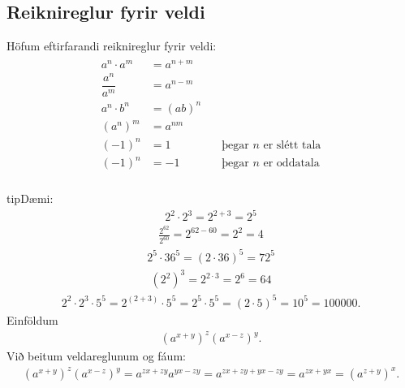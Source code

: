 \documentclass[a4paper,10pt,icelandic]{sphinxmanual}
\begin{document}
\subsection{Reiknireglur fyrir veldi}
\label{\detokenize{Kafli01:reiknireglur-fyrir-veldi}}
Höfum eftirfarandi reiknireglur fyrir veldi:
\begin{equation*}
\begin{split}\begin{aligned}
a^n\cdot a^m&=a^{n+m} &\\
\dfrac {a^n}{a^m}&=a^{n-m}&\\
a^n\cdot b^n&=(ab)^n&\\
(a^n)^m&=a^{nm} &\\
(-1)^n &= 1 &\quad \text{þegar } n \text{ er slétt tala} \\
(-1)^n &= -1& \quad \text{þegar } n \text{ er oddatala} \\
\end{aligned}\end{split}
\end{equation*}
\begin{sphinxadmonition}{tip}{Dæmi:}
\begin{equation*}
\begin{split}2^2 \cdot 2^3=2^{2+3}=2^5\end{split}
\end{equation*}
\begin{equation*}
\begin{split}\frac{2^{62}}{2^{60}}=2^{62-60}=2^{2}=4\end{split}
\end{equation*}
\begin{equation*}
\begin{split}2^5 \cdot 36^5=(2 \cdot 36)^5=72^5\end{split}
\end{equation*}
\begin{equation*}
\begin{split}(2^2)^3=2^{2 \cdot 3}=2^6=64\end{split}
\end{equation*}
\begin{equation*}
\begin{split}2^2\cdot 2^3\cdot 5^5=2^{(2+3)}\cdot 5^5=2^5\cdot 5^5=(2\cdot 5)^5=10^5=100000.\end{split}
\end{equation*}
 Einföldum
\begin{equation*}
\begin{split}(a^{x+y})^z (a^{x-z})^y.\end{split}
\end{equation*}
Við beitum veldareglunum og fáum:
\begin{equation*}
\begin{split}(a^{x+y})^z (a^{x-z})^y = a^{zx + zy}a^{yx - zy} = a^{zx + zy + yx - zy} = a^{zx + yx} = (a^{z+y})^x.\end{split}
\end{equation*}\end{sphinxadmonition}
\end{document}
